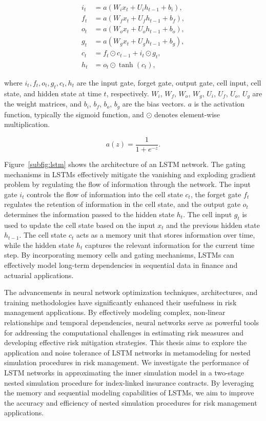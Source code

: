 \begin{align*}
    i_t &= a(W_i x_t + U_i h_{t-1} + b_i), \\
    f_t &= a(W_f x_t + U_f h_{t-1} + b_f), \\
    o_t &= a(W_o x_t + U_o h_{t-1} + b_o), \\
    g_t &= a(W_g x_t + U_g h_{t-1} + b_g), \\
    c_t &= f_t \odot c_{t-1} + i_t \odot g_t, \\
    h_t &= o_t \odot \tanh(c_t),
\end{align*}

where $i_t, f_t, o_t, g_t, c_t, h_t$ are the input gate, forget gate, output gate, cell input, cell state, and hidden state at time $t$, respectively.
$W_i$, $W_f$, $W_o$, $W_g$, $U_i$, $U_f$, $U_o$, $U_g$ are the weight matrices, and $b_i$, $b_f$, $b_o$, $b_g$ are the bias vectors.
$a$ is the activation function, typically the sigmoid function, and $\odot$ denotes element-wise multiplication.

\begin{equation*}
    a(z) = \frac{1}{1 + e^{-z}}.
\end{equation*}

Figure~\ref{subfig:lstm} shows the architecture of an LSTM network.
The gating mechanisms in LSTMs effectively mitigate the vanishing and exploding gradient problem by regulating the flow of information through the network.
The input gate $i_t$ controls the flow of information into the cell state $c_t$, the forget gate $f_t$ regulates the retention of information in the cell state, and the output gate $o_t$ determines the information passed to the hidden state $h_t$.
The cell input $g_t$ is used to update the cell state based on the input $x_t$ and the previous hidden state $h_{t-1}$.
The cell state $c_t$ acts as a memory unit that stores information over time, while the hidden state $h_t$ captures the relevant information for the current time step.
By incorporating memory cells and gating mechanisms, LSTMs can effectively model long-term dependencies in sequential data in finance and actuarial applications.

The advancements in neural network optimization techniques, architectures, and training methodologies have significantly enhanced their usefulness in risk management applications.
By effectively modeling complex, non-linear relationships and temporal dependencies, neural networks serve as powerful tools for addressing the computational challenges in estimating risk measures and developing effective risk mitigation strategies.
This thesis aims to explore the application and noise tolerance of LSTM networks in metamodeling for nested simulation procedures in risk management.
We investigate the performance of LSTM networks in approximating the inner simulation model in a two-stage nested simulation procedure for index-linked insurance contracts.
By leveraging the memory and sequential modeling capabilities of LSTMs, we aim to improve the accuracy and efficiency of nested simulation procedures for risk management applications.

